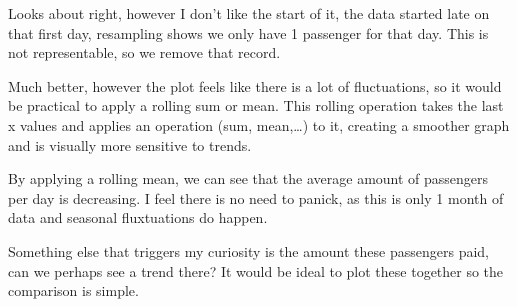 \documentclass[letterpaper,10pt,english]{jupyterBook}
\begin{document}
\noindent{}

\sphinxAtStartPar
Looks about right, however I don’t like the start of it, the data started late on that first day, resampling shows we only have 1 passenger for that day.
This is not representable, so we remove that record.

\begin{sphinxVerbatim}[commandchars=\\\{\}]
  \PYG{p}{[}\PYG{p}{]}
   
\end{sphinxVerbatim}

\noindent{}

\sphinxAtStartPar
Much better, however the plot feels like there is a lot of fluctuations, so it would be practical to apply a rolling sum or mean.
This rolling operation takes the last x values and applies an operation (sum, mean,…) to it, creating a smoother graph and is visually more sensitive to trends.

\begin{sphinxVerbatim}[commandchars=\\\{\}]
  
   
\end{sphinxVerbatim}

\noindent{}

\sphinxAtStartPar
By applying a rolling mean, we can see that the average amount of passengers per day is decreasing.
I feel there is no need to panick, as this is only 1 month of data and seasonal fluxtuations do happen.

\sphinxAtStartPar
Something else that triggers my curiosity is the amount these passengers paid, can we perhaps see a trend there?
It would be ideal to plot these together so the comparison is simple.
\end{document}
